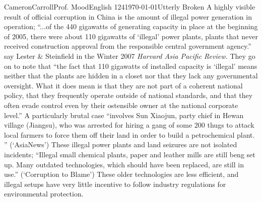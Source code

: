 \begin{mla}{Cameron}{Carroll}{Prof. Mood}{English 124}{\today}{Utterly Broken}
 A highly visible result of official corruption in China is the amount of illegal power generation in operation; ``...of the 440 gigawatts of generating capacity in place at the beginning of 2005, there were about 110 gigawatts of `illegal' power plants, plants that never received construction approval from the responsible central government agency.'' say Lester \& Steinfield in the Winter 2007 \emph{Harvard Asia Pacific Review.} They go on to note that ``the fact that 110 gigawatts of installed capacity is `illegal' means neither that the plants are hidden in a closet nor that they lack any governmental oversight. What it does mean is that they are not part of a coherent national policy, that they frequently operate outside of national standards, and that they often evade control even by their ostensible owner at the national corporate level.'' A particularly brutal case ``involves Sun Xiaojun, party chief in Hewan village (Jiangsu), who was arrested for hiring a gang of some 200 thugs to attack local farmers to force them off their land in order to build a petrochemical plant. '' (`AsiaNews') These illegal power plants and land seizures are not isolated incidents; ``Illegal small chemical plants, paper and leather mills are still beng set up. Many outdated technologies, which should have been replaced, are still in use.'' (`Corruption to Blame') These older technologies are less efficient, and illegal setups have very little incentive to follow industry regulations for environmental protection. 


\end{mla}
